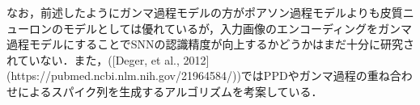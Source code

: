 なお，前述したようにガンマ過程モデルの方がポアソン過程モデルよりも皮質ニューロンのモデルとしては優れているが，入力画像のエンコーディングをガンマ過程モデルにすることでSNNの認識精度が向上するかどうかはまだ十分に研究されていない．また，([Deger, et al., 2012](https://pubmed.ncbi.nlm.nih.gov/21964584/))ではPPDやガンマ過程の重ね合わせによるスパイク列を生成するアルゴリズムを考案している．